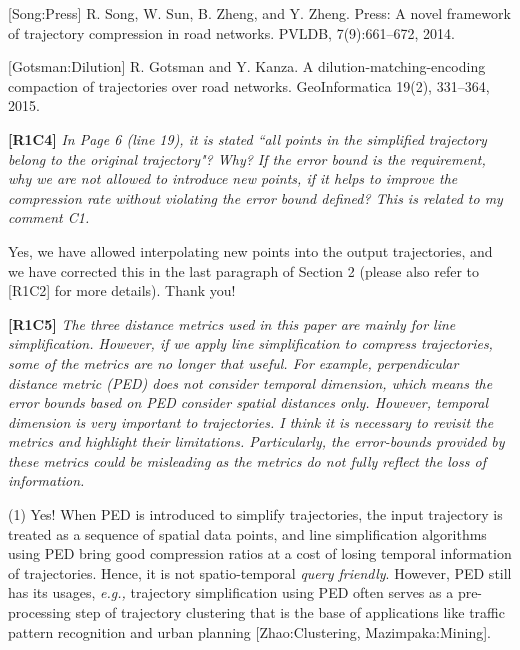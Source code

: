 \documentclass{letter}
\newcommand{\eg}{\emph{e.g.,}\xspace}
\begin{document}


[Song:Press] R. Song, W. Sun, B. Zheng, and Y. Zheng. Press: A novel framework of trajectory compression in road networks. PVLDB, 7(9):661--672, 2014.

[Gotsman:Dilution] R. Gotsman and Y. Kanza. A dilution-matching-encoding compaction of trajectories over road networks. GeoInformatica 19(2), 331--364, 2015.



\textbf{[R1C4]} \emph{ In Page 6 (line 19), it is stated ``all points in the simplified trajectory belong to the original trajectory"? Why? If the error bound is the requirement, why we are not allowed to introduce new points, if it helps to improve the compression rate without violating the error bound defined? This is related to my comment C1. }

Yes, we have allowed interpolating new points into the output trajectories, and we have corrected this in the last paragraph of Section 2 (please also refer to [R1C2] for more details). Thank you!


\textbf{[R1C5]} \emph{The three distance metrics used in this paper are mainly for line simplification. However, if we apply line simplification to compress trajectories, some of the metrics are no longer that useful. For example, perpendicular distance metric (PED) does not consider temporal dimension, which means the error bounds based on PED consider spatial distances only. However, temporal dimension is very important to trajectories. I think it is necessary to revisit the metrics and highlight their limitations. Particularly, the error-bounds provided by these metrics could be misleading as the metrics do not fully reflect the loss of information. }

(1) Yes! When PED is introduced to simplify trajectories, the input trajectory is treated as a sequence of spatial data points, and line simplification algorithms using PED bring good compression ratios at a cost of losing temporal information of trajectories. Hence, it is not spatio-temporal \emph{query friendly}.
However, PED still has its usages, \eg trajectory simplification using PED often serves as a pre-processing step of trajectory clustering that is the base of applications like traffic pattern recognition and urban planning [Zhao:Clustering, Mazimpaka:Mining].
\end{document}
